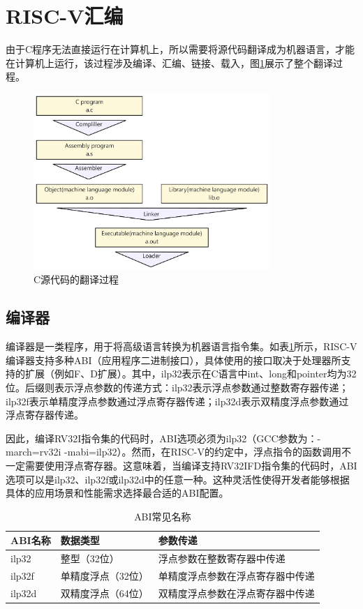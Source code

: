 \section{RISC-V汇编}
由于C程序无法直接运行在计算机上，所以需要将源代码翻译成为机器语言，才能在计算机上运行，该过程涉及编译、汇编、链接、载入，图\ref{fig:compile}展示了整个翻译过程。

\begin{figure}[htbp]
	\centering
	\includegraphics[width=0.8\textwidth]{image/compile.pdf}
	\caption{C源代码的翻译过程}
	\label{fig:compile}
\end{figure}

\subsection{编译器}
编译器是一类程序，用于将高级语言转换为机器语言指令集。如表\ref{tab:riscv_abi_state}所示，RISC-V编译器支持多种ABI（应用程序二进制接口），具体使用的接口取决于处理器所支持的扩展（例如F、D扩展）。其中，ilp32表示在C语言中int、long和pointer均为32位。后缀则表示浮点参数的传递方式：ilp32表示浮点参数通过整数寄存器传递；ilp32f表示单精度浮点参数通过浮点寄存器传递；ilp32d表示双精度浮点参数通过浮点寄存器传递。

因此，编译RV32I指令集的代码时，ABI选项必须为ilp32（GCC参数为：-march=rv32i -mabi=ilp32）。然而，在RISC-V的约定中，浮点指令的函数调用不一定需要使用浮点寄存器。这意味着，当编译支持RV32IFD指令集的代码时，ABI选项可以是ilp32、ilp32f或ilp32d中的任意一种。这种灵活性使得开发者能够根据具体的应用场景和性能需求选择最合适的ABI配置。

\begin{table}[htbp]
	\centering
	\caption{ABI常见名称}
	\begin{tabularx}{\textwidth}{>{\centering\arraybackslash}p{3cm} >{\centering\arraybackslash}p{5cm} >{\centering\arraybackslash}X}
		\toprule
		\textbf{ABI名称} & \textbf{数据类型} & \textbf{参数传递}    \\
		\midrule
		ilp32          & 整型（32位）       & 浮点参数在整数寄存器中传递    \\
		ilp32f         & 单精度浮点（32位）    & 单精度浮点参数在浮点寄存器中传递 \\
		ilp32d         & 双精度浮点（64位）    & 双精度浮点参数在浮点寄存器中传递 \\
		\bottomrule
	\end{tabularx}
	\label{tab:riscv_abi_state}
\end{table}

